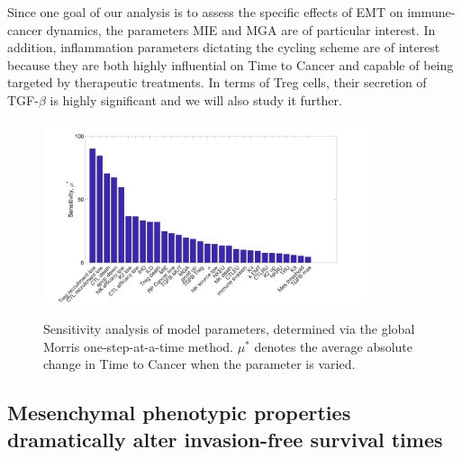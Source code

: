 \documentclass[11pt]{article}
\begin{document}
Since one goal of our analysis is to assess the specific effects of EMT on immune-cancer dynamics, the parameters MIE and MGA are of particular interest.
In addition, inflammation parameters dictating the cycling scheme are of interest because they are both highly influential on Time to Cancer and capable of being targeted by therapeutic treatments.
In terms of Treg cells, their secretion of TGF-$\beta$ is highly significant and we will also study it further.


\begin{figure}
\center
{\includegraphics[width=0.85\textwidth]{Figure2/MOAT.jpg}}
\caption{Sensitivity analysis of model parameters, determined via the global Morris one-step-at-a-time method. $\mu^*$ denotes the average absolute change in Time to Cancer when the parameter is varied.}
\label{fig:MOAT}
\end{figure}

\subsection{Mesenchymal phenotypic properties dramatically alter invasion-free survival times}\label{MesPars}
\end{document}
